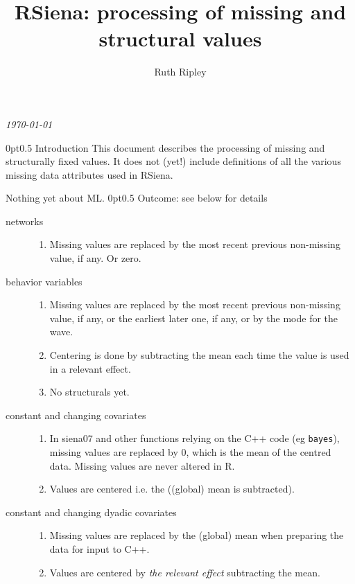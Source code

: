 \documentclass[12pt,a4paper]{article}
\makeatletter
\renewcommand{\=}{\,=\,}
\newcommand{\+}{\,+\,}
\renewcommand{\section}{\@startsection{section}{1}
                {0pt}{\baselineskip}{0.5\baselineskip}
                {\centering\sffamily} }
\makeatother
\begin{document}
\title{RSiena: processing of missing and structural values}
\author{Ruth Ripley}
\date{}
\maketitle

\centerline{\emph{\today}}
\bigskip
\section{Introduction}
This document describes the processing of missing and structurally fixed
values. It does not (yet!) include definitions of all the various missing data
attributes used in RSiena.

Nothing yet about ML.
\section{Outcome: see below for details}
\begin{description}
\item[networks]\hfill
\begin{enumerate}
\item Missing values are replaced by the most recent previous non-missing value,
  if any. Or zero.
\end{enumerate}
\item[behavior variables]\hfill
\begin{enumerate}
\item Missing values are replaced by the most recent previous non-missing value,
  if any, or the earliest later one, if any, or by the mode for the wave.
\item Centering is done by subtracting the mean each time the value is
  used in a relevant effect.
\item No structurals yet.
\end{enumerate}
\item[constant and changing covariates] \hfill
\begin{enumerate}
\item In siena07 and other functions relying on the C++ code (eg
  \verb|bayes|), missing values are replaced by 0, which is the mean of the
  centred data. Missing values are never altered in R.
\item Values are centered i.e. the ((global) mean is
  subtracted).
\end{enumerate}
\item[constant and changing dyadic covariates]\hfill
\begin{enumerate}
\item Missing values are replaced by the (global) mean when preparing the data
  for input to C++.
\item Values are centered by \emph{the relevant effect} subtracting the mean.
\end{enumerate}
\end{description}
\end{document}
